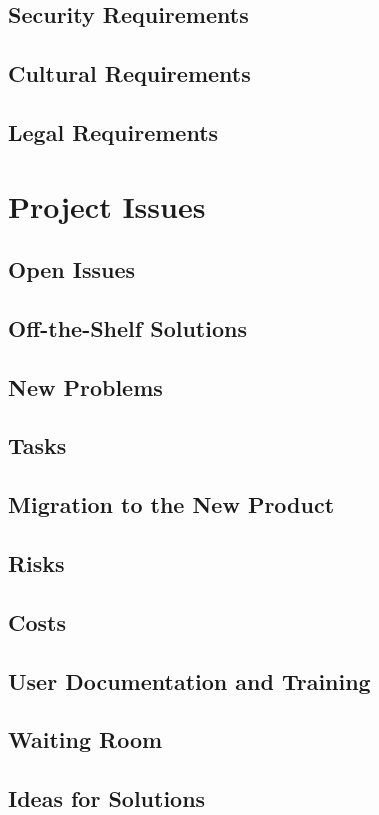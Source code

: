 \documentclass[12pt,fleqn]{article}
\begin{document}
\subsection {Security Requirements}

\subsection {Cultural Requirements}

\subsection {Legal Requirements}

\pagebreak

\section {Project Issues}

\subsection {Open Issues}

\subsection {Off-the-Shelf Solutions}

\subsection {New Problems}

\subsection {Tasks}

\subsection {Migration to the New Product}

\subsection {Risks}

\subsection {Costs}

\subsection {User Documentation and Training}

\subsection {Waiting Room}

\subsection {Ideas for Solutions}
\end{document}
